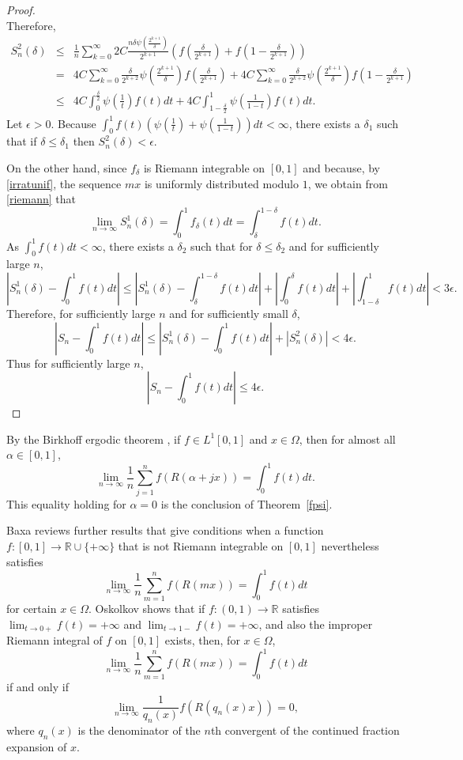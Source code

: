 \documentclass{amsart}
\begin{document}
\begin{proof}
\[\]
Therefore,
\begin{eqnarray*}
S_n^2(\delta)&\leq&\frac{1}{n}\sum_{k=0}^\infty  2C \frac{n\delta \psi\left( \frac{2^{k+1}}{\delta} \right)}{2^{k+1}} \left(f\left( \frac{\delta}{2^{k+1}} \right) + f\left(1-  \frac{\delta}{2^{k+1}} \right) \right)\\
&=&4C\sum_{k=0}^\infty  \frac{\delta}{2^{k+2}} \psi\left( \frac{2^{k+1}}{\delta} \right) f\left( \frac{\delta}{2^{k+1}} \right) 
+4C\sum_{k=0}^\infty \frac{\delta}{2^{k+2}} \psi\left( \frac{2^{k+1}}{\delta} \right) f\left(1-  \frac{\delta}{2^{k+1}} \right)\\
&\leq&4C\int_0^{\frac{\delta}{2}} \psi\left(\frac{1}{t}\right) f(t) dt + 4C\int_{1-\frac{\delta}{2}}^1 \psi\left(\frac{1}{1-t}\right) f(t) dt.
\end{eqnarray*}
Let $\epsilon>0$. Because $\int_0^1 f(t) \left( \psi\left(\frac{1}{t}\right)+\psi\left(\frac{1}{1-t}\right) \right) dt<\infty$, there exists a $\delta_1$ such that if
$\delta \leq \delta_1$ then $S_n^2(\delta)<\epsilon$.

On the other hand, since $f_\delta$ is Riemann integrable on $[0,1]$ and because, by \eqref{irratunif}, the sequence $mx$ is uniformly distributed modulo $1$, we obtain from
\eqref{riemann} that
\[
\lim_{n \to \infty} S_n^1(\delta)=\int_0^1 f_\delta(t) dt=\int_\delta^{1-\delta} f(t)dt.
\]
As $\int_0^1 f(t)dt < \infty$, there exists a $\delta_2$ such that for $\delta \leq \delta_2$ and for sufficiently large $n$,
\[
\left| S_n^1(\delta)-\int_0^1 f(t) dt\right| \leq \left|S_n^1(\delta) - \int_\delta^{1-\delta} f(t) dt \right| +
\left| \int_0^\delta f(t) dt \right| + \left| \int_{1-\delta}^1 f(t) dt \right| < 3\epsilon.
\]
Therefore, for sufficiently large $n$ and for sufficiently small $\delta$,
\[
\left|S_n - \int_0^1 f(t)dt \right| \leq \left|S_n^1(\delta) - \int_0^1 f(t)dt  \right| + \left|S_n^2(\delta) \right|
<
 4\epsilon.
\]
Thus for sufficiently large $n$,
\[
\left|S_n - \int_0^1 f(t)dt \right| \leq 4\epsilon.
\]
\end{proof}

By the Birkhoff ergodic theorem \cite[p.~44, Theorem~2.30]{einsiedler}, if $f \in L^1[0,1]$ and $x \in \Omega$, then for almost all
$\alpha \in [0,1]$,
\[
\lim_{n \to \infty} \frac{1}{n} \sum_{j=1}^n f(R(\alpha+jx))=\int_0^1 f(t) dt.
\]
This equality holding for $\alpha=0$ is the conclusion of Theorem~\ref{fpsi}. 

Baxa \cite{MR2189068} reviews further results that give conditions when a function $f:[0,1] \to \mathbb{R} \cup \{+\infty\}$ that is not Riemann integrable on $[0,1]$ nevertheless satisfies
\[
\lim_{n \to \infty} \frac{1}{n} \sum_{m=1}^n f(R(mx))= \int_0^1 f(t)dt
\]
for certain $x \in \Omega$. Oskolkov \cite[p.~170, Theorem~1]{MR1044053}  shows that if $f:(0,1) \to \mathbb{R}$ satisfies
$\lim_{t \to 0+} f(t)=+\infty$ and $\lim_{t \to 1-} f(t)=+\infty$, and also the improper Riemann integral of $f$ on $[0,1]$ exists, then, for $x \in \Omega$,
\[
\lim_{n \to \infty} \frac{1}{n} \sum_{m=1}^n f(R(mx))= \int_0^1 f(t)dt
\]
if and only if 
\[
\lim_{n \to \infty} \frac{1}{q_n(x)} f(R(q_n(x) x))=0,
\]
where $q_n(x)$ is the denominator of the $n$th convergent of the continued fraction expansion of $x$.
\end{document}
